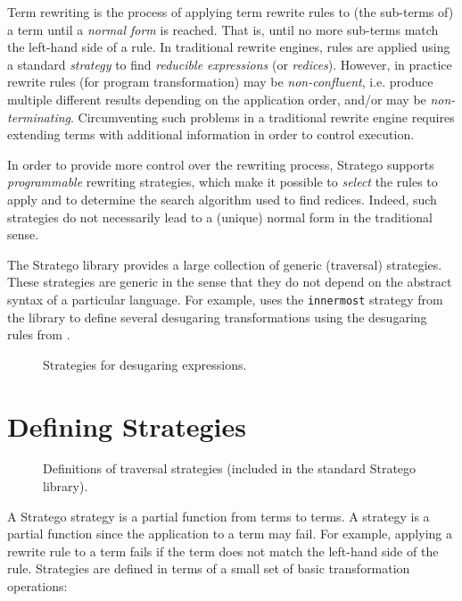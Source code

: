 Term rewriting is the process of applying term rewrite rules to (the sub-terms
of) a term until a \emph{normal form} is reached. That is, until no more
sub-terms match the left-hand side of a rule. In traditional rewrite engines,
rules are applied using a standard \emph{strategy} to find \emph{reducible
expressions} (or \emph{redices}).
However, in practice rewrite rules (for program transformation) may be
\emph{non-confluent}, i.e. produce multiple different results depending on the
application order, and/or may be \emph{non-terminating}. Circumventing such
problems in a traditional rewrite engine requires extending terms with
additional information in order to control execution.

In order to provide more control over the rewriting process, Stratego supports
\emph{programmable} rewriting strategies, which make it possible to
\emph{select} the rules to apply and to determine the search algorithm used to
find redices.
Indeed, such strategies do not necessarily lead to a (unique) normal form in the
traditional sense.

The Stratego library provides a large collection of generic (traversal)
strategies. These strategies are generic in the sense that they do not depend on
the abstract syntax of a particular language. For example, 
uses the \texttt{innermost} strategy from the library to define several
desugaring transformations using the desugaring rules from
.

\begin{figure}[t]

\caption{Strategies for desugaring expressions.}
\end{figure}

\section{Defining Strategies}

\begin{figure}[t]

\caption{Definitions of traversal strategies (included in the standard
Stratego library).}
\end{figure}

A Stratego strategy is a partial function from terms to terms. A strategy is a
partial function since the application to a term may fail. For example, applying
a rewrite rule to a term fails if the term does not match the left-hand side of
the rule. Strategies are defined in terms of a small set of basic
transformation operations:

